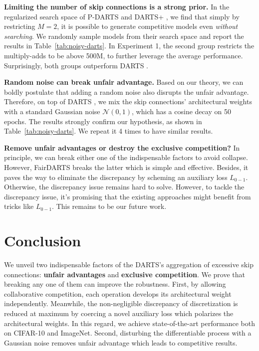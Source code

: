 \documentclass[runningheads]{llncs}
\begin{document}
\textbf{Limiting the number of skip connections is a strong prior.}  In the regularized search space of P-DARTS \cite{chen2019progressive}  and DARTS+ \cite{liang2019darts}, we find that simply by restricting $M=2$, it is possible to generate competitive models even \emph{without searching}. We randomly sample models from their search space and report the results in Table~\ref{tab:noisy-darts}. In Experiment 1, the second group restricts the multiply-adds to be above 500M, to further leverage the average performance.  Surprisingly, both groups outperform DARTS \cite{liu2018darts}.  




\textbf{Random noise can break unfair advantage.} Based on our theory, we can boldly postulate that adding a random noise also disrupts the unfair advantage. Therefore, on top of DARTS \cite{liu2018darts}, we mix the skip connections' architectural weights with a standard Gaussian noise $\mathcal{N}(0,1)$, which has a cosine decay on 50 epochs. The results strongly confirm our hypothesis, as shown in Table~\ref{tab:noisy-darts}. We repeat it 4 times to have similar results. 

\textbf{Remove unfair advantages or destroy the exclusive competition?} In principle, we can break either one of the indispensable factors to avoid collapse. However,  FairDARTS breaks the latter which is simple and effective. Besides, it paves the way to eliminate the discrepancy by scheming an auxiliary loss $L_{0-1}$. Otherwise, the discrepancy issue remains hard to solve. However, to tackle the discrepancy issue, it's promising that the existing approaches might benefit from tricks like $L_{0-1}$. This remains to be our future work.  


\section{Conclusion}

We unveil two indispensable factors of the DARTS's aggregation of excessive skip connections: \textbf{unfair advantages} and \textbf{exclusive competition}. We prove that breaking any one of them can improve the robustness. First, by allowing collaborative competition, each operation develops its architectural weight independently. Meanwhile, the non-negligible discrepancy of discretization is reduced at maximum by coercing a novel auxiliary loss which polarizes the architectural weights. In this regard, we achieve state-of-the-art performance both on CIFAR-10 and ImageNet. Second, disturbing the differentiable process with a Gaussian noise removes unfair advantage which leads to competitive results. 
 
\end{document}
